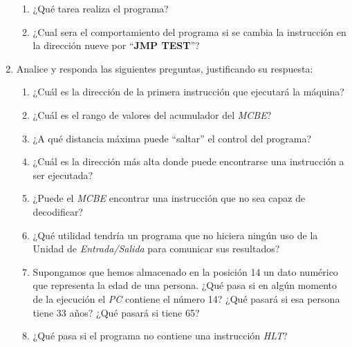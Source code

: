 \documentclass[12pt]{article}
\begin{document}
\begin{enumerate}
\begin{tabular}{|r||l|l|l|}
        \end{tabular}

        \begin{enumerate}

            \item ¿Qué tarea realiza el programa?

            \item ¿Cual sera el comportamiento del programa si se cambia la
                instrucción en la dirección nueve por ``\textbf{JMP TEST}''?

        \end{enumerate}


    \item Analice y responda las siguientes preguntas, justificando su
        respuesta:

        \begin{enumerate}

            \item ¿Cuál es la dirección de la primera instrucción que
                ejecutará la máquina?

            \item ¿Cuál es el rango de valores del acumulador del \emph{MCBE}?

            \item ¿A qué distancia máxima puede ``saltar'' el control del
                programa?

            \item ¿Cuál es la dirección más alta donde puede encontrarse una
                instrucción a ser ejecutada?

            \item ¿Puede el \emph{MCBE} encontrar una instrucción que no sea
                capaz de decodificar?

            \item ¿Qué utilidad tendría un programa que no hiciera ningún uso
                de la Unidad de \emph{Entrada/Salida} para comunicar sus
                resultados?

            \item Supongamos que hemos almacenado en la posición 14 un dato
                numérico que representa la edad de una persona. ¿Qué pasa si
                en algún momento de la ejecución el \emph{PC} contiene el
                número 14?  ¿Qué pasará si esa persona tiene 33 años? ¿Qué
                pasará si tiene 65?

            \item ¿Qué pasa si el programa no contiene una instrucción
                \emph{HLT}?


\end{enumerate}
\end{enumerate}
\end{document}
